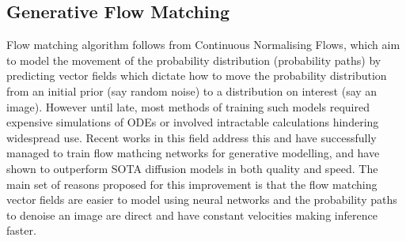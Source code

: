 \documentclass[12pt]{article}
\begin{document}
\subsection{Generative Flow Matching}
Flow matching algorithm follows from Continuous Normalising Flows, which aim to model the movement of the probability distribution (probability paths) by predicting vector fields which dictate how to move the probability distribution from an initial prior (say random noise) to a distribution on interest (say an image).  However until late, most methods of training such models required expensive simulations of ODEs or involved intractable calculations hindering widespread use. Recent works in this field address this and have successfully managed to train flow mathcing networks for generative modelling, and have shown to outperform SOTA diffusion models in both quality and speed. The main set of reasons proposed for this improvement is that the flow matching vector fields are easier to model using neural networks and the probability paths to denoise an image are direct and have constant velocities making inference faster. ~\cite{lipman2023flow}
\end{document}
